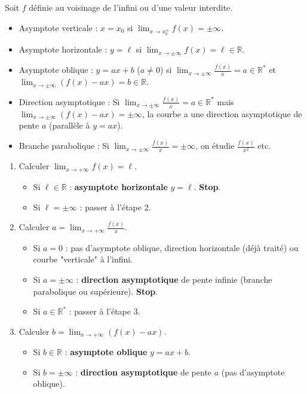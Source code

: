 \documentclass[11pt]{article}
\newcommand{\cle}[1]{{\popxbold\color{popdark}#1}}
\begin{document}
\begin{definition}
Soit $f$ définie au voisinage de l'infini ou d'une valeur interdite.
\begin{itemize}
  \item \cle{Asymptote verticale} : $x = x_0$ si $\lim_{x \to x_0^{\pm}} f(x) = \pm \infty$.
  \item \cle{Asymptote horizontale} : $y = \ell$ si $\lim_{x \to \pm\infty} f(x) = \ell \in \mathbb{R}$.
  \item \cle{Asymptote oblique} : $y = ax + b$ ($a \neq 0$) si $\lim_{x \to \pm\infty} \frac{f(x)}{x} = a \in \mathbb{R}^*$ et $\lim_{x \to \pm\infty} (f(x) - ax) = b \in \mathbb{R}$.
  \item \cle{Direction asymptotique} : Si $\lim_{x \to \pm\infty} \frac{f(x)}{x} = a \in \mathbb{R}^*$ mais $\lim_{x \to \pm\infty} (f(x) - ax) = \pm \infty$, la courbe a une direction asymptotique de pente $a$ (parallèle à $y=ax$).
  \item \cle{Branche parabolique} : Si $\lim_{x \to \pm\infty} \frac{f(x)}{x} = \pm \infty$, on étudie $\frac{f(x)}{x^2}$ etc.
\end{itemize}
\end{definition}

\begin{methode}
\begin{enumerate}
  \item Calculer $\lim_{x \to +\infty} f(x) = \ell$.
    \begin{itemize}
      \item Si $\ell \in \mathbb{R}$ : \textbf{asymptote horizontale} $y = \ell$. \textbf{Stop}.
      \item Si $\ell = \pm \infty$ : passer à l'étape 2.
    \end{itemize}
  \item Calculer $a = \lim_{x \to +\infty} \frac{f(x)}{x}$.
    \begin{itemize}
      \item Si $a = 0$ : pas d'asymptote oblique, direction horizontale (déjà traité) ou courbe "verticale" à l'infini.
      \item Si $a = \pm \infty$ : \textbf{direction asymptotique} de pente infinie (branche parabolique ou supérieure). \textbf{Stop}.
      \item Si $a \in \mathbb{R}^*$ : passer à l'étape 3.
    \end{itemize}
  \item Calculer $b = \lim_{x \to +\infty} (f(x) - ax)$.
    \begin{itemize}
      \item Si $b \in \mathbb{R}$ : \textbf{asymptote oblique} $y = ax + b$.
      \item Si $b = \pm \infty$ : \textbf{direction asymptotique} de pente $a$ (pas d'asymptote oblique).
    \end{itemize}
\end{enumerate}
\end{methode}
\end{document}
